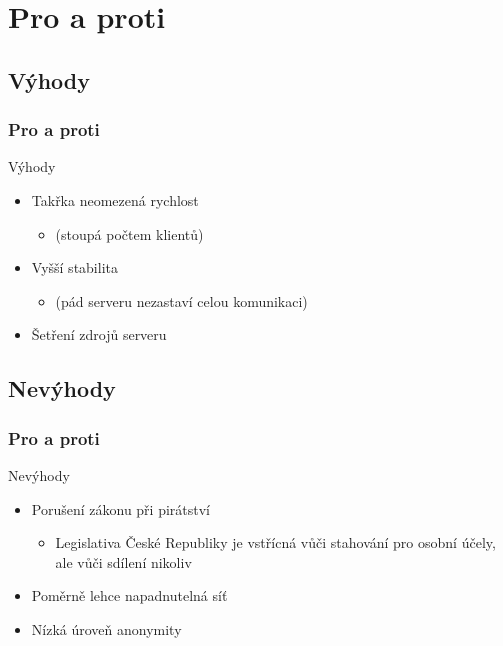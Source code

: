 \documentclass{beamer}
\begin{document}
\section{Pro a proti}

\subsection{Výhody}
\begin{frame}
\frametitle{Pro a proti}
\begin{block}{Výhody}
\begin{itemize}
\item Takřka neomezená rychlost
\begin{itemize}
\item (stoupá počtem klientů)
\end{itemize}
\item Vyšší stabilita
\begin{itemize}
\item (pád serveru nezastaví celou komunikaci)
\end{itemize}
\item Šetření zdrojů serveru
\end{itemize}
\end{block}
\end{frame}

\subsection{Nevýhody}
\begin{frame}
\frametitle{Pro a proti}
\begin{alertblock}{Nevýhody}
\begin{itemize}
\item Porušení zákonu při pirátství
\begin{itemize}
\item Legislativa České Republiky je vstřícná vůči stahování pro osobní účely, ale vůči sdílení nikoliv
\end{itemize}
\item Poměrně lehce napadnutelná síť
\item Nízká úroveň anonymity
\end{itemize}
\end{alertblock}
\end{frame}
\end{document}

